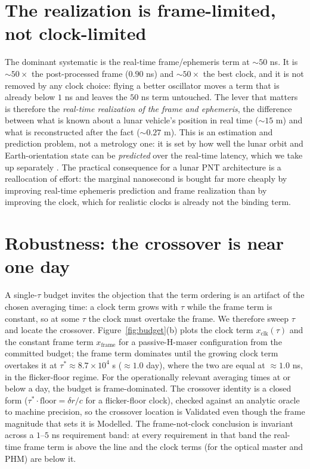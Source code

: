 \documentclass[conference]{IEEEtran}
\begin{document}
\section{The realization is frame-limited, not clock-limited}
\label{sec:frame}
The dominant systematic is the real-time frame/ephemeris term at $\sim$$50$ ns. It is
$\sim$$50\times$ the post-processed frame ($0.90$ ns) and $\sim$$50\times$ the best
clock, and it is not removed by any clock choice: flying a better oscillator moves a
term that is already below $1$ ns and leaves the $50$ ns term untouched. The lever
that matters is therefore the \emph{real-time realization of the frame and
ephemeris}, the difference between what is known about a lunar vehicle's position in
real time ($\sim$$15$ m) and what is reconstructed after the fact ($\sim$$0.27$ m).
This is an estimation and prediction problem, not a metrology one: it is set by how
well the lunar orbit and Earth-orientation state can be \emph{predicted} over the
real-time latency, which we take up separately \cite{baweja2026eop}. The practical
consequence for a lunar PNT architecture is a reallocation of effort: the marginal
nanosecond is bought far more cheaply by improving real-time ephemeris prediction and
frame realization than by improving the clock, which for realistic clocks is already
not the binding term.

\section{Robustness: the crossover is near one day}
\label{sec:robust}
A single-$\tau$ budget invites the objection that the term ordering is an artifact of
the chosen averaging time: a clock term grows with $\tau$ while the frame term is
constant, so at some $\tau$ the clock must overtake the frame. We therefore sweep
$\tau$ and locate the crossover. Figure~\ref{fig:budget}(b) plots the clock term
$x_{\mathrm{clk}}(\tau)$ and the constant frame term $x_{\mathrm{frame}}$ for a
passive-H-maser configuration from the committed budget; the frame term dominates
until the growing clock term overtakes it at $\tau^\ast\approx8.7\times10^{4}$ s
($\approx1.0$ day), where the two are equal at $\approx1.0$ ns, in the flicker-floor
regime. For the operationally relevant
averaging times at or below a day, the budget is frame-dominated. The crossover
identity is a closed form ($\tau^\ast\!\cdot\!\mathrm{floor}=\delta r/c$ for a
flicker-floor clock), checked against an analytic oracle to machine precision, so the
crossover location is Validated even though the frame magnitude that sets it is
Modelled. The frame-not-clock conclusion is invariant across a $1$--$5$ ns
requirement band: at every requirement in that band the real-time frame term is above
the line and the clock terms (for the optical master and PHM) are below it.
\end{document}
